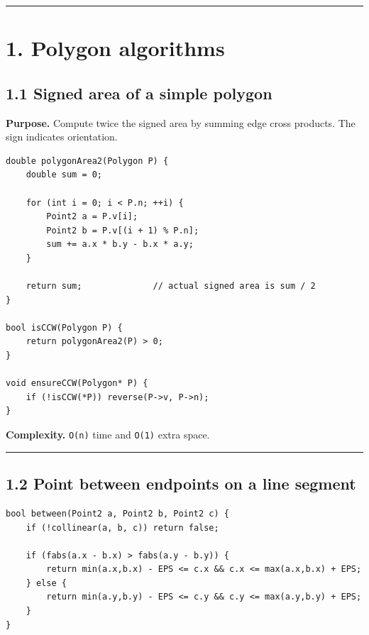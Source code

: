 \documentclass[11pt]{article}
\begin{document}
\begin{center}\rule{0.5\linewidth}{0.5pt}\end{center}

\section{1. Polygon algorithms}\label{polygon-algorithms}

\subsection{1.1 Signed area of a simple
polygon}\label{signed-area-of-a-simple-polygon}

\textbf{Purpose.} Compute twice the signed area by summing edge cross
products. The sign indicates orientation.

\begin{verbatim}
double polygonArea2(Polygon P) {
    double sum = 0;

    for (int i = 0; i < P.n; ++i) {
        Point2 a = P.v[i];
        Point2 b = P.v[(i + 1) % P.n];
        sum += a.x * b.y - b.x * a.y;
    }

    return sum;              // actual signed area is sum / 2
}

bool isCCW(Polygon P) {
    return polygonArea2(P) > 0;
}

void ensureCCW(Polygon* P) {
    if (!isCCW(*P)) reverse(P->v, P->n);
}
\end{verbatim}

\textbf{Complexity.} \texttt{O(n)} time and
\texttt{O(1)} extra space.

\begin{center}\rule{0.5\linewidth}{0.5pt}\end{center}

\subsection{1.2 Point between endpoints on a line
segment}\label{point-between-endpoints-on-a-line-segment}

\begin{verbatim}
bool between(Point2 a, Point2 b, Point2 c) {
    if (!collinear(a, b, c)) return false;

    if (fabs(a.x - b.x) > fabs(a.y - b.y)) {
        return min(a.x,b.x) - EPS <= c.x && c.x <= max(a.x,b.x) + EPS;
    } else {
        return min(a.y,b.y) - EPS <= c.y && c.y <= max(a.y,b.y) + EPS;
    }
}
\end{verbatim}
\end{document}
